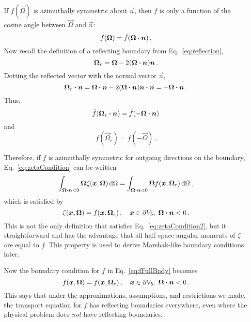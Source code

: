 If $f(\vec{\Omega})$ is azimuthally symmetric about $\vec{n}$, then $f$ is only
a function of the cosine angle between $\vec{\Omega}$ and $\vec{n}$:
\begin{equation*}
f(\bm{\Omega}) = \hat f( \bm{\Omega} \bm{\cdot} \bm{n})\,.
\end{equation*}
Now recall the definition of a reflecting boundary from
Eq.~\eqref{eq:reflection},
\begin{equation*}
  \bm{\Omega}_r = \bm{\Omega} - 2(\bm{\Omega} \bm{\cdot} \bm{n}) \bm{n}\,.
\end{equation*}
Dotting the reflected vector with the normal vector $\vec{n}$,
\begin{equation*}
  \bm{\Omega}_r \bm{\cdot} \bm{n}
  = \bm{\Omega} \bm{\cdot} \bm{n} - 2(\bm{\Omega} \bm{\cdot} \bm{n}) \bm{n}\bm{\cdot} \bm{n}
  = - \bm{\Omega} \bm{\cdot} \bm{n}\,.
\end{equation*}
Thus,
\begin{equation*}
  \hat f( \bm{\Omega}_r \bm{\cdot} \bm{n}) = \hat f( -\bm{\Omega} \bm{\cdot} \bm{n})
\end{equation*}
and
\begin{equation}\label{eq:aziSymResult}
  f( \vec{\Omega}_r) = f( -\vec{\Omega} )\,.
\end{equation}

Therefore, if $f$ is azimuthally symmetric for outgoing directions on the
boundary, Eq.~\eqref{eq:zetaCondition} can be written
\begin{equation}\label{eq:zetaCondition2}
  \int_{\bm{\Omega} \bm{\cdot} \bm{n} < 0}
  \bm{\Omega} \zeta(\bm{x}, \bm{\Omega})\mathop{}\!\mathrm{d}\Omega
  = \int_{\bm{\Omega} \bm{\cdot} \bm{n} < 0}
  \bm{\Omega} f(\bm{x}, \bm{\Omega}_r)\mathop{}\!\mathrm{d}\Omega \,,
\end{equation}
which is satisfied by
\begin{equation} \label{eq:zeta}
  \zeta(\bm{x}, \bm{\Omega}) = f(\bm{x}, \bm{\Omega}_r) \,,
 \quad \bm{x} \in \partial V_b, \ \bm{\Omega} \bm{\cdot} \bm{n} < 0 \,.
\end{equation}
This is not the only definition that satisfies Eq.~\eqref{eq:zetaCondition2},
but it straightforward and has the advantage that all half-space angular moments
of $\zeta$ are equal to $f$. This property is used to derive Marshak-like
boundary conditions later.

Now the boundary condition for $f$ in Eq.~\eqref{eq:fFullBndy} becomes
\begin{equation} \label{eq:fFullBndy2}
  f(\bm{x}, \bm{\Omega}) = f(\bm{x}, \bm{\Omega}_r) \,,
 \quad \bm{x} \in \partial V_b, \ \bm{\Omega} \bm{\cdot} \bm{n} < 0\,.
\end{equation}
This says that under the approximations, assumptions, and restrictions we made,
the transport equation for $f$ has reflecting boundaries everywhere, even
where the physical problem does \emph{not} have reflecting boundaries.

